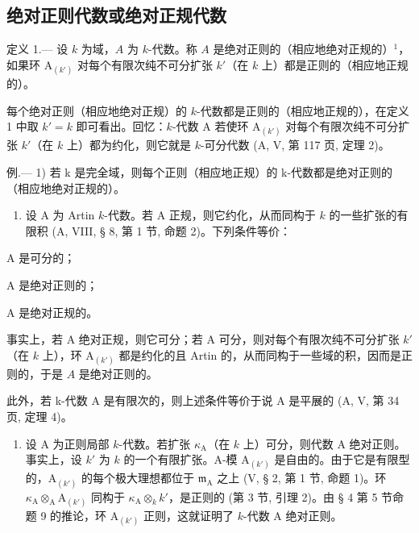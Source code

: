 \subsection{绝对正则代数或绝对正规代数}

定义 1.--- 设 \(k\) 为域，\(A\) 为 \(k\)-代数。称 \(A\) 是绝对正则的（相应地绝对正规的）\(^{1}\)，如果环 \(\mathrm{A}_{(k')}\) 对每个有限次纯不可分扩张 \(k'\)（在 \(k\) 上）都是正则的（相应地正规的）。

每个绝对正则（相应地绝对正规）的 \(k\)-代数都是正则的（相应地正规的），在定义 1 中取 \(k' = k\) 即可看出。回忆：\(k\)-代数 A 若使环 \(\mathrm{A}_{(k')}\) 对每个有限次纯不可分扩张 \(k'\)（在 \(k\) 上）都为约化，则它就是 \(k\)-可分代数 (A, V, 第 117 页, 定理 2)。

例.--- 1) 若 k 是完全域，则每个正则（相应地正规）的 k-代数都是绝对正则的（相应地绝对正规的）。

\begin{enumerate}
\def\labelenumi{\arabic{enumi})}
\setcounter{enumi}{1}
\tightlist
\item
  设 A 为 Artin \(k\)-代数。若 A 正规，则它约化，从而同构于 \(k\) 的一些扩张的有限积 (A, VIII, § 8, 第 1 节, 命题 2)。下列条件等价：
\end{enumerate}

A 是可分的；

A 是绝对正则的；

A 是绝对正规的。

事实上，若 A 绝对正规，则它可分；若 A 可分，则对每个有限次纯不可分扩张 \(k'\)（在 \(k\) 上），环 \(\mathrm{A}_{(k')}\) 都是约化的且 Artin 的，从而同构于一些域的积，因而是正则的，于是 \(A\) 是绝对正则的。

此外，若 k-代数 A 是有限次的，则上述条件等价于说 A 是平展的 (A, V, 第 34 页, 定理 4)。

\begin{enumerate}
\def\labelenumi{\arabic{enumi})}
\setcounter{enumi}{2}
\tightlist
\item
  设 A 为正则局部 \(k\)-代数。若扩张 \(\kappa_{\mathrm{A}}\)（在 \(k\) 上）可分，则代数 A 绝对正则。事实上，设 \(k'\) 为 \(k\) 的一个有限扩张。A-模 \(\mathrm{A}_{(k')}\) 是自由的。由于它是有限型的，\(\mathrm{A}_{(k')}\) 的每个极大理想都位于 \(\mathfrak{m}_{\mathrm{A}}\) 之上 (V, § 2, 第 1 节, 命题 1)。环 \(\kappa_{\mathrm{A}} \otimes_{\mathrm{A}} \mathrm{A}_{(k')}\) 同构于 \(\kappa_{\mathrm{A}} \otimes_{k} k'\)，是正则的 (第 3 节, 引理 2)。由 § 4 第 5 节命题 9 的推论，环 \(\mathrm{A}_{(k')}\) 正则，这就证明了 \(k\)-代数 A 绝对正则。
\end{enumerate}

